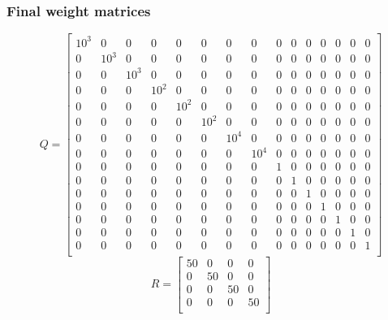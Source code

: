 
\subsubsection{Final weight matrices}

$$
Q=\begin{bmatrix}
10^3 & 0 & 0 & 0 & 0 & 0 & 0 & 0 & 0 & 0 & 0 & 0 & 0 & 0 & 0 \\
0 & 10^3 & 0 & 0 & 0 & 0 & 0 & 0 & 0 & 0 & 0 & 0 & 0 & 0 & 0 \\
0 & 0 & 10^3 & 0 & 0 & 0 & 0 & 0 & 0 & 0 & 0 & 0 & 0 & 0 & 0 \\
0 & 0 & 0 & 10^2 & 0 & 0 & 0 & 0 & 0 & 0 & 0 & 0 & 0 & 0 & 0 \\
0 & 0 & 0 & 0 & 10^2 & 0 & 0 & 0 & 0 & 0 & 0 & 0 & 0 & 0 & 0 \\
0 & 0 & 0 & 0 & 0 & 10^2 & 0 & 0 & 0 & 0 & 0 & 0 & 0 & 0 & 0 \\
0 & 0 & 0 & 0 & 0 & 0 & 10^4 & 0 & 0 & 0 & 0 & 0 & 0 & 0 & 0 \\
0 & 0 & 0 & 0 & 0 & 0 & 0 & 10^4 & 0 & 0 & 0 & 0 & 0 & 0 & 0 \\
0 & 0 & 0 & 0 & 0 & 0 & 0 & 0 & 1 & 0 & 0 & 0 & 0 & 0 & 0 \\
0 & 0 & 0 & 0 & 0 & 0 & 0 & 0 & 0 & 1 & 0 & 0 & 0 & 0 & 0 \\
0 & 0 & 0 & 0 & 0 & 0 & 0 & 0 & 0 & 0 & 1 & 0 & 0 & 0 & 0 \\
0 & 0 & 0 & 0 & 0 & 0 & 0 & 0 & 0 & 0 & 0 & 1 & 0 & 0 & 0 \\
0 & 0 & 0 & 0 & 0 & 0 & 0 & 0 & 0 & 0 & 0 & 0 & 1 & 0 & 0 \\
0 & 0 & 0 & 0 & 0 & 0 & 0 & 0 & 0 & 0 & 0 & 0 & 0 & 1 & 0 \\
0 & 0 & 0 & 0 & 0 & 0 & 0 & 0 & 0 & 0 & 0 & 0 & 0 & 0 & 1 \\
\end{bmatrix}
$$
$$
R=\begin{bmatrix}
50 & 0 & 0 & 0 \\
0 & 50 & 0 & 0 \\
0 & 0 & 50 & 0 \\
0 & 0 & 0 & 50 \\
\end{bmatrix}
$$